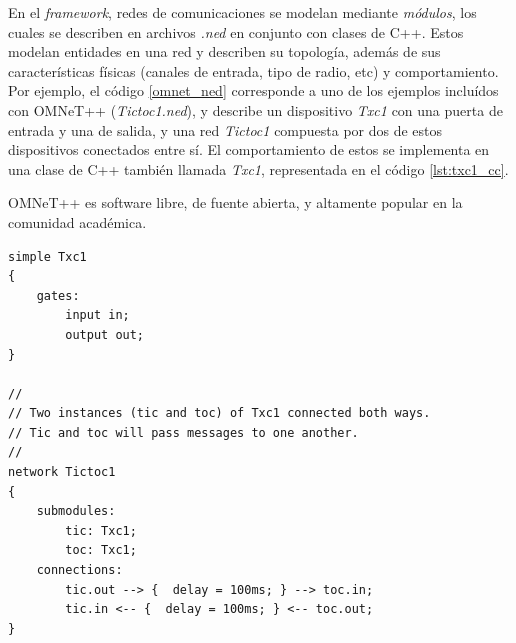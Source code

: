 \documentclass[11pt,letterpaper]{article}
\begin{document}
En el \emph{framework}, redes de comunicaciones se modelan mediante \emph{módulos}, los cuales se describen en archivos \emph{.ned} en conjunto con clases de C++. Estos modelan entidades en una red y describen su topología, además de sus características físicas (canales de entrada, tipo de radio, etc) y comportamiento. Por ejemplo, el código \ref{omnet_ned} corresponde a uno de los ejemplos incluídos con OMNeT++ (\emph{Tictoc1.ned}), y describe un dispositivo \emph{Txc1} con una puerta de entrada y una de salida, y una red \emph{Tictoc1} compuesta por dos de estos dispositivos conectados entre sí. El comportamiento de estos se implementa en una clase de C++ también llamada \emph{Txc1}, representada en el código \ref{lst:txc1_cc}.

OMNeT++ es software libre, de fuente abierta, y altamente popular en la comunidad académica.

\noindent\begin{minipage}{\linewidth}
	\begin{lstlisting}[style=CPP, caption={Descripción de un módulo simple de OMNeT y su red asociada.}, label={omnet_ned}]
simple Txc1
{
    gates:
        input in;
        output out;
}

//
// Two instances (tic and toc) of Txc1 connected both ways.
// Tic and toc will pass messages to one another.
//
network Tictoc1
{
    submodules:
        tic: Txc1;
        toc: Txc1;
    connections:
        tic.out --> {  delay = 100ms; } --> toc.in;
        tic.in <-- {  delay = 100ms; } <-- toc.out;
}
	\end{lstlisting}
\end{minipage}
\end{document}
